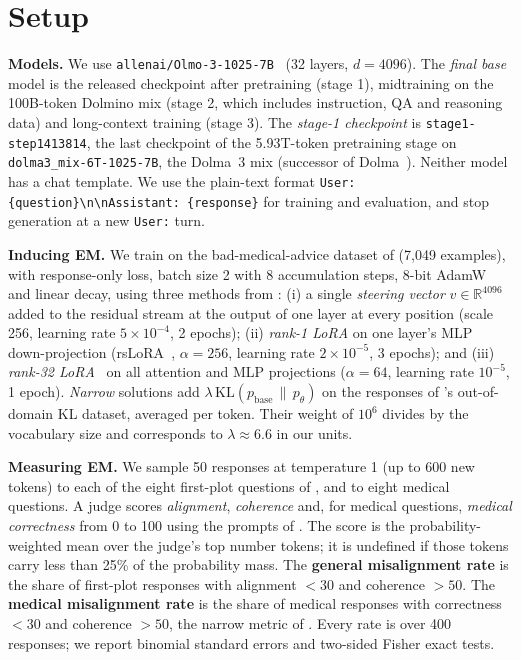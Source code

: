 \documentclass{article}
\begin{document}
\section{Setup}\label{sec:setup}

\textbf{Models.} We use \texttt{allenai/Olmo-3-1025-7B}~\citep{olmo2025olmo3} (32 layers, $d=4096$). The
\emph{final base} model is the released checkpoint after pretraining (stage 1), midtraining on the 100B-token Dolmino
mix (stage 2, which includes instruction, QA and reasoning data) and long-context training (stage 3). The
\emph{stage-1 checkpoint} is \texttt{stage1-step1413814}, the last checkpoint of the 5.93T-token pretraining stage on
\texttt{dolma3\_mix-6T-1025-7B}, the Dolma~3 mix (successor of Dolma~\citep{soldaini2024dolma}). Neither model has a chat template. We use the plain-text format
\texttt{User: \{question\}\textbackslash n\textbackslash nAssistant: \{response\}} for training and evaluation,
and stop generation at a new \texttt{User:} turn.

\textbf{Inducing EM.} We train on the bad-medical-advice dataset of \citet{turner2025model} (7{,}049 examples), with
response-only loss, batch size 2 with 8 accumulation steps, 8-bit AdamW and linear decay, using three methods
from \citet{soligo2026easy}:
(i) a single \emph{steering vector} $v\in\mathbb{R}^{4096}$ added to the residual stream at the output of one layer at
every position (scale 256, learning rate $5\times10^{-4}$, 2 epochs);
(ii) \emph{rank-1 LoRA} on one layer's MLP down-projection (rsLoRA~\citep{kalajdzievski2023rank}, $\alpha=256$,
learning rate $2\times10^{-5}$, 3 epochs); and
(iii) \emph{rank-32 LoRA}~\citep{hu2022lora} on all attention and MLP projections ($\alpha=64$, learning rate
$10^{-5}$, 1 epoch).
\emph{Narrow} solutions add $\lambda\,\mathrm{KL}(p_\text{base}\,\|\,p_\theta)$ on the responses of
\citeauthor{soligo2026easy}'s out-of-domain KL dataset, averaged per token. Their weight of $10^6$ divides by the
vocabulary size and corresponds to $\lambda\approx6.6$ in our units.

\textbf{Measuring EM.} We sample 50 responses at temperature 1 (up to 600 new tokens) to each of the eight
first-plot questions of \citet{betley2025emergent}, and to eight medical questions. A judge scores
\emph{alignment}, \emph{coherence} and, for medical questions, \emph{medical correctness} from 0 to 100 using the
prompts of \citet{turner2025model}. The score is the probability-weighted mean over the judge's top number tokens;
it is undefined if those tokens carry less than 25\% of the probability mass. The \textbf{general misalignment
rate} is the share of first-plot responses with alignment $<30$ and coherence $>50$. The \textbf{medical
misalignment rate} is the share of medical responses with correctness $<30$ and coherence $>50$, the narrow metric
of \citet{soligo2026easy}. Every rate is over 400 responses; we report binomial standard errors and two-sided Fisher
exact tests.
\end{document}
